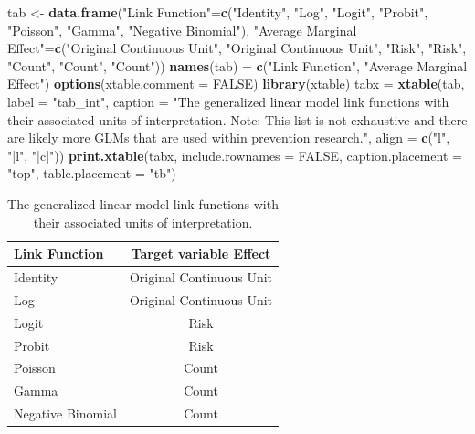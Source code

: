 \documentclass[]{article}
\newenvironment{Shaded}{\begin{snugshade}}{\end{snugshade}}
\newcommand{\KeywordTok}[1]{\textcolor[rgb]{0.13,0.29,0.53}{\textbf{#1}}}
\newcommand{\DataTypeTok}[1]{\textcolor[rgb]{0.13,0.29,0.53}{#1}}
\newcommand{\StringTok}[1]{\textcolor[rgb]{0.31,0.60,0.02}{#1}}
\newcommand{\OtherTok}[1]{\textcolor[rgb]{0.56,0.35,0.01}{#1}}
\newcommand{\NormalTok}[1]{#1}
\begin{document}
\begin{Shaded}
\begin{Highlighting}[]
\NormalTok{tab <-}\StringTok{ }\KeywordTok{data.frame}\NormalTok{(}\StringTok{"Link Function"}\NormalTok{=}\KeywordTok{c}\NormalTok{(}\StringTok{"Identity"}\NormalTok{, }\StringTok{"Log"}\NormalTok{, }\StringTok{"Logit"}\NormalTok{, }\StringTok{"Probit"}\NormalTok{, }\StringTok{"Poisson"}\NormalTok{, }\StringTok{"Gamma"}\NormalTok{, }\StringTok{"Negative Binomial"}\NormalTok{),}
                  \StringTok{"Average Marginal Effect"}\NormalTok{=}\KeywordTok{c}\NormalTok{(}\StringTok{"Original Continuous Unit"}\NormalTok{, }\StringTok{"Original Continuous Unit"}\NormalTok{, }\StringTok{"Risk"}\NormalTok{, }\StringTok{"Risk"}\NormalTok{, }\StringTok{"Count"}\NormalTok{, }\StringTok{"Count"}\NormalTok{, }\StringTok{"Count"}\NormalTok{))}
\KeywordTok{names}\NormalTok{(tab) =}\StringTok{ }\KeywordTok{c}\NormalTok{(}\StringTok{"Link Function"}\NormalTok{, }\StringTok{"Average Marginal Effect"}\NormalTok{)}
\KeywordTok{options}\NormalTok{(}\DataTypeTok{xtable.comment =} \OtherTok{FALSE}\NormalTok{)}
\KeywordTok{library}\NormalTok{(xtable)}
\NormalTok{tabx =}\StringTok{ }\KeywordTok{xtable}\NormalTok{(tab, }
       \DataTypeTok{label =} \StringTok{"tab_int"}\NormalTok{, }
       \DataTypeTok{caption =} \StringTok{"The generalized linear model link functions with their associated units of interpretation. Note: This list is not exhaustive and there are likely more GLMs that are used within prevention research."}\NormalTok{,}
       \DataTypeTok{align =} \KeywordTok{c}\NormalTok{(}\StringTok{"l"}\NormalTok{, }\StringTok{"|l"}\NormalTok{, }\StringTok{"|c|"}\NormalTok{))}
\KeywordTok{print.xtable}\NormalTok{(tabx, }\DataTypeTok{include.rownames =} \OtherTok{FALSE}\NormalTok{, }\DataTypeTok{caption.placement =} \StringTok{"top"}\NormalTok{,}
             \DataTypeTok{table.placement =} \StringTok{"tb"}\NormalTok{)}
\end{Highlighting}
\end{Shaded}

\begin{table}[tb]
\centering
\caption{The generalized linear model link functions with their associated units of interpretation.} 
\label{tab_int}
\begin{tabular}{lc}
\toprule
Link Function & Target variable Effect \\ 
\midrule
Identity & Original Continuous Unit \\ 
  Log & Original Continuous Unit \\ 
  Logit & Risk \\ 
  Probit & Risk \\ 
  Poisson & Count \\ 
  Gamma & Count \\ 
  Negative Binomial & Count \\ 
\bottomrule
\end{tabular}
\end{table}
\end{document}
